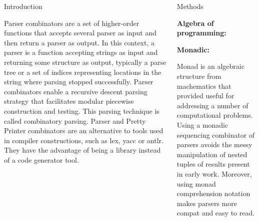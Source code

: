 \documentclass[final]{beamer}
\newlength{\onecolwid}
\newlength{\twocolwid}
\begin{document}
\begin{frame}[t]
\begin{columns}[t]
\begin{column}{\twocolwid}
\begin{columns}[t,totalwidth=\twocolwid]
\begin{column}{\onecolwid}

\begin{block}{Introduction}

Parser combinators are a set of higher-order functions that accepts several parser as input and then return a parser as output. In this context, a parser is a function accepting strings as input and returning some structure as output, typically a parse tree or a set of indices representing locations in the string where parsing stopped successfully. Parser combinators enable a recursive descent parsing strategy that facilitates modular piecewise construction and testing.
This parsing technique is called combinatory parsing. Parser and Pretty Printer combinators are an alternative to tools used in compiler constructions, such as lex, yacc or antlr. They have the advantage of being a library instead of a code generator tool.

\end{block}


\end{column} %

\begin{column}{\onecolwid}\vspace{-.6in} %


\begin{block}{Methods}

\textbf{Algebra of programming:}

\textbf{Monadic:}

Monad is an algebraic structure from machematics that provided useful for addressing a
number of computational problems. Using a monadic sequencing combinator of parsers avoids
the messy manipulation of nested tuples of results present in early work. Moreover, using
monad comprehension notation makes parsers more compat and easy to read.




\end{block}
\end{column}
\end{columns}
\end{column}
\end{columns}
\end{frame}
\end{document}
